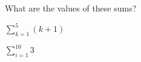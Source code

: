 
%
%
%

	What are the values of these sums?
	\begin{subproblem}
		\item $\sum\limits_{k=1}^5 (k + 1)$
		\skipitem
		\item $\sum\limits_{i=1}^{10} 3$
	\end{subproblem}

\solution
	\begin{subproblem}
		\item 
		\skipitem
		\item 
	\end{subproblem}

